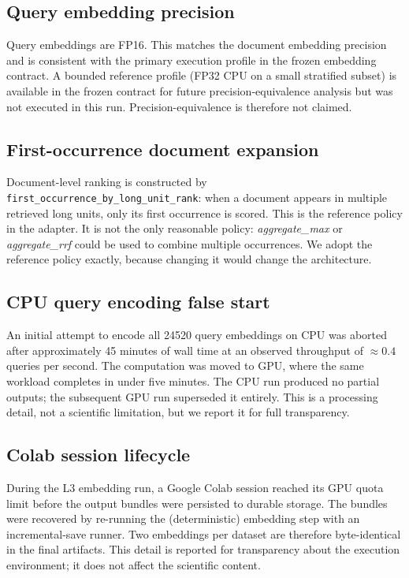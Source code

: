 \documentclass[11pt,a4paper]{article}
\begin{document}
\subsection{Query embedding precision}
Query embeddings are FP16. This matches the document embedding
precision and is consistent with the primary execution profile in
the frozen embedding contract. A bounded reference profile (FP32 CPU
on a small stratified subset) is available in the frozen contract
for future precision-equivalence analysis but was not executed in
this run. Precision-equivalence is therefore not claimed.

\subsection{First-occurrence document expansion}
Document-level ranking is constructed by
\texttt{first\_occurrence\_by\_long\_unit\_rank}: when a document
appears in multiple retrieved long units, only its first occurrence
is scored. This is the reference policy in the adapter. It is not
the only reasonable policy: \emph{aggregate\_max} or
\emph{aggregate\_rrf} could be used to combine multiple occurrences.
We adopt the reference policy exactly, because changing it would
change the architecture.

\subsection{CPU query encoding false start}
An initial attempt to encode all \num{24520} query embeddings on CPU
was aborted after approximately \SI{45}{} minutes of wall time at an
observed throughput of $\approx \num{0.4}$ queries per second. The
computation was moved to GPU, where the same workload completes in
under five minutes. The CPU run produced no partial outputs; the
subsequent GPU run superseded it entirely. This is a processing
detail, not a scientific limitation, but we report it for full
transparency.

\subsection{Colab session lifecycle}
During the L3 embedding run, a Google Colab session reached its GPU
quota limit before the output bundles were persisted to durable
storage. The bundles were recovered by re-running the (deterministic)
embedding step with an incremental-save runner. Two embeddings per
dataset are therefore byte-identical in the final artifacts. This
detail is reported for transparency about the execution environment;
it does not affect the scientific content.
\end{document}
